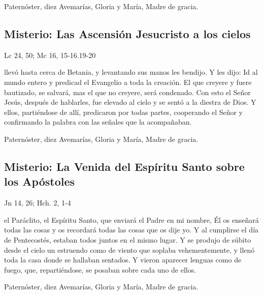 \documentclass[10pt,a4paper,oneside]{book}
\newcounter{glorious-counter}
\begin{document}
\begin{center}
      Paternóster, diez Avemarías, Gloria y María, Madre de gracia.
\end{center}

\subsection*{ Misterio: Las Ascensión Jesucristo a los cielos}
\begin{flushright}
      {\color{red}Lc 24, 50; Mc 16, 15-16.19-20}
\end{flushright}
 llevó hasta cerca de Betania, y levantando sus manos les bendijo. Y les dijo: Id al mundo entero y predicad el Evangelio a toda la creación. 
El que creyere y fuere bautizado, se salvará, mas el que no creyere, será condenado. Con esto el Señor Jesús, después de hablarles, fue elevado al cielo y se sentó a la diestra de Dios. 
Y ellos, partiéndose de allí, predicaron por todas partes, cooperando el Señor y confirmando la palabra con las señales que la acompañaban.

\begin{center}
      Paternóster, diez Avemarías, Gloria y María, Madre de gracia.
\end{center}

\subsection*{ Misterio: La Venida del Espíritu Santo sobre los Apóstoles}
\begin{flushright}
      {\color{red}Jn 14, 26; Hch. 2, 1-4}
\end{flushright}
 el Paráclito, el Espíritu Santo, que enviará el Padre en mi nombre, Él os enseñará todas las cosas y os recordará todas las cosas que os dije yo. 
Y al cumplirse el día de Pentecostés, estaban todos juntos en el mismo lugar. Y se produjo de súbito desde el cielo un estruendo como de viento que soplaba vehementemente, 
y llenó toda la casa donde se hallaban sentados. Y vieron aparecer lenguas como de fuego, que, repartiéndose, se posaban sobre cada uno de ellos.

\begin{center}
      Paternóster, diez Avemarías, Gloria y María, Madre de gracia.
\end{center}
\end{document}
